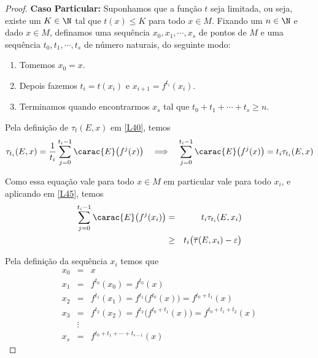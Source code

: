 \begin{proof}
\textbf{Caso Particular:} Suponhamos que a função $t$ seja limitada, ou seja, existe um $K\in\N$ tal que $t(x)\leq K$ para todo $x\in M$. Fixando um $n\in\N$ e dado $x \in M$, definamos uma sequência $x_0,x_1,\cdots,x_s$ de pontos de $M$ e uma sequência $t_0,t_1,\cdots,t_s$ de número naturais, do seguinte modo:

\begin{enumerate}
\item Tomemos $x_0=x$.
\item Depois fazemos $t_i=t(x_i)$ e $x_{i+1}=f^{t_i}(x_i)$.
\item Terminamos quando encontrarmos $x_s$ tal que $t_0+t_1+\cdots+t_s\geq n$.
\end{enumerate}

Pela definição de $\tau_t(E,x)$ em \eqref{L40}, temos
\begin{equation*}
\tau_{t_i}(E,x)=\dfrac{1}{t_i}\sum_{j=0}^{t_i-1}\carac{E}\big(f^j(x)\big)\quad\Longrightarrow\quad\sum_{j=0}^{t_i-1}\carac{E}\big(f^j(x)\big)=t_i\tau_{t_i}(E,x)
\end{equation*}

Como essa equação vale para todo $x\in M$ em particular vale para todo $x_i$, e aplicando em \eqref{L45}, temos
\begin{eqnarray}
\sum_{j=0}^{t_i-1}\carac{E}\big(f^j(x_i)\big) & = &  t_i\tau_{t_i}(E,x_i)\nonumber\\
 & \geq & t_i\big(\overline{\tau}(E,x_i)-\varepsilon\big)\label{L46}
\end{eqnarray}

Pela definição da sequência $x_i$ temos que
\begin{eqnarray*} 
x_0 & = & x\\
x_1 & = & f^{t_0}(x_0) = f^{t_0}(x)\\
x_2 & = & f^{t_1}(x_1) = f^{t_1}\big(f^{t_0}(x)\big) = f^{t_0+t_1}(x)\\
x_3 & = & f^{t_2}(x_2) = f^{t_2}\big(f^{t_0+t_1}(x)\big) = f^{t_0+t_1+t_2}(x)\\
& \vdots & \\
x_s & = & f^{t_0+t_1+\cdots+t_{s-1}}(x)
\end{eqnarray*}


\end{proof}
